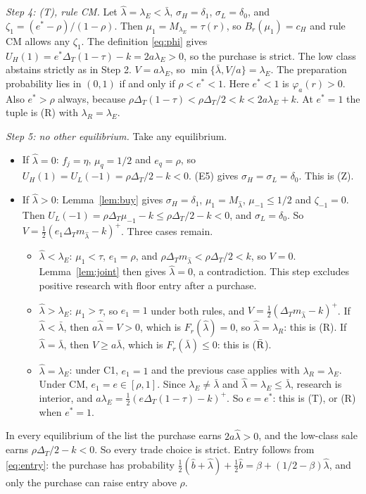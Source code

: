 \documentclass[12pt]{article}
\theoremstyle{definition}
\theoremstyle{remark}
\newcommand{\DT}{\Delta_T}
\newcommand{\lh}{\hat\lambda}
\newcommand{\lb}{\bar\lambda}
\begin{document}
\emph{Step 4: (T), rule CM.} Let $\lh=\lambda_E<\lb$, $\sigma_H=\delta_1$, $\sigma_L=\delta_0$, and
$\zeta_1=(e^*-\rho)/(1-\rho)$. Then $\mu_1=M_{\lambda_E}=\tau(r)$, so $B_r(\mu_1)=c_H$ and rule CM allows any
$\zeta_1$. The definition \eqref{eq:phi} gives $U_H(1)=e^*\DT(1-\tau)-k=2a\lambda_E>0$, so the purchase is strict.
The low class abstains strictly as in Step 2. $V=a\lambda_E$, so $\min\{\lb,V/a\}=\lambda_E$. The preparation
probability lies in $(0,1)$ if and only if $\rho<e^*<1$. Here $e^*<1$ is $\varphi_a(r)>0$. Also
$e^*>\rho$ always, because $\rho\DT(1-\tau)<\rho\DT/2<k<2a\lambda_E+k$. At $e^*=1$ the tuple is (R) with
$\lambda_R=\lambda_E$.

\emph{Step 5: no other equilibrium.} Take any equilibrium.
\begin{itemize}[nosep]
\item If $\lh=0$: $f_j=\eta$, $\mu_q=1/2$ and $e_q=\rho$, so $U_H(1)=U_L(-1)=\rho\DT/2-k<0$. (E5) gives
  $\sigma_H=\sigma_L=\delta_0$. This is (Z).
\item If $\lh>0$: Lemma~\ref{lem:buy} gives $\sigma_H=\delta_1$, $\mu_1=M_{\lh}$, $\mu_{-1}\le1/2$ and $\zeta_{-1}=0$.
  Then $U_L(-1)=\rho\DT\mu_{-1}-k\le\rho\DT/2-k<0$, and $\sigma_L=\delta_0$. So $V=\frac12(e_1\DT m_{\lh}-k)^+$. Three
  cases remain.
  \begin{itemize}[nosep]
  \item $\lh<\lambda_E$: $\mu_1<\tau$, $e_1=\rho$, and $\rho\DT m_{\lh}<\rho\DT/2<k$, so $V=0$. Lemma~\ref{lem:joint} then
    gives $\lh=0$, a contradiction. This step excludes positive research with floor entry after a purchase.
  \item $\lh>\lambda_E$: $\mu_1>\tau$, so $e_1=1$ under both rules, and $V=\frac12(\DT m_{\lh}-k)^+$. If $\lh<\lb$, then
    $a\lh=V>0$, which is $F_r(\lh)=0$, so $\lh=\lambda_R$: this is (R). If $\lh=\lb$, then $V\ge a\lb$, which is
    $F_r(\lb)\le0$: this is ($\bar{\rm R}$).
  \item $\lh=\lambda_E$: under C1, $e_1=1$ and the previous case applies with $\lambda_R=\lambda_E$. Under CM,
    $e_1=e\in[\rho,1]$. Since $\lambda_E\ne\lb$ and $\lh=\lambda_E\le\lb$, research is interior, and
    $a\lambda_E=\frac12(e\DT(1-\tau)-k)^+$. So $e=e^*$: this is (T), or (R) when $e^*=1$.
  \end{itemize}
\end{itemize}
In every equilibrium of the list the purchase earns $2a\lh>0$, and the low-class sale earns $\rho\DT/2-k<0$. So
every trade choice is strict. Entry follows from \eqref{eq:entry}: the purchase has probability
$\frac12(\hat b+\lh)+\frac12\hat b=\beta+(1/2-\beta)\lh$, and only the purchase can raise entry above $\rho$.
\end{document}
